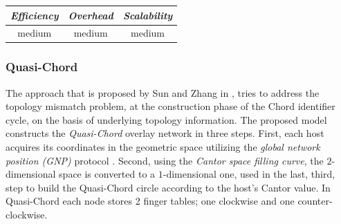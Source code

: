 \begin{center}
\begin{tabular}{ccc}
\emph{Efficiency} & \emph{Overhead} & \emph{Scalability} \\
\hline
%
medium &
%
medium &
%
medium
\end{tabular}
\end{center}

\subsubsection{Quasi-Chord}
The approach that is proposed by Sun and Zhang in \cite{SZ2008}, tries
to address the topology mismatch problem, at the construction phase of the
Chord identifier cycle, on the basis of underlying topology information.
The proposed model constructs the \emph{Quasi-Chord} overlay network in three
steps. First, each host acquires its coordinates in the geometric space
utilizing the \emph{global network position (GNP)} protocol \cite{ng_gnp_2001}.
Second, using the \emph{Cantor space filling curve}, the $2$-dimensional space
is converted to a $1$-dimensional one, used in the last, third, step to build
the Quasi-Chord circle according to the host's Cantor value. In Quasi-Chord
each node stores 2 finger tables; one clockwise and one counter-clockwise.

